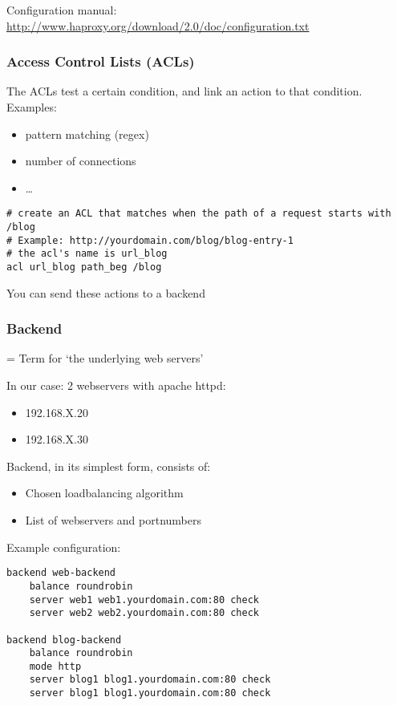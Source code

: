 \documentclass{article}
\begin{document}
Configuration manual: \url{http://www.haproxy.org/download/2.0/doc/configuration.txt}

\subsubsection{Access Control Lists (ACLs)}

The ACLs test a certain condition, and link an action to that condition. Examples:

\begin{itemize}
    \item pattern matching (regex)
    \item number of connections
    \item \dots
\end{itemize}

\begin{verbatim}
# create an ACL that matches when the path of a request starts with /blog
# Example: http://yourdomain.com/blog/blog-entry-1
# the acl's name is url_blog
acl url_blog path_beg /blog
\end{verbatim}

You can send these actions to a backend

\subsubsection{Backend}

= Term for `the underlying web servers'

In our case: 2 webservers with apache httpd:

\begin{itemize}
    \item 192.168.X.20
    \item 192.168.X.30
\end{itemize}

Backend, in its simplest form, consists of:

\begin{itemize}
    \item Chosen loadbalancing algorithm
    \item List of webservers and portnumbers
\end{itemize}

Example configuration:

\begin{verbatim}
backend web-backend
    balance roundrobin
    server web1 web1.yourdomain.com:80 check
    server web2 web2.yourdomain.com:80 check

backend blog-backend
    balance roundrobin
    mode http
    server blog1 blog1.yourdomain.com:80 check
    server blog1 blog1.yourdomain.com:80 check
\end{verbatim}
\end{document}
